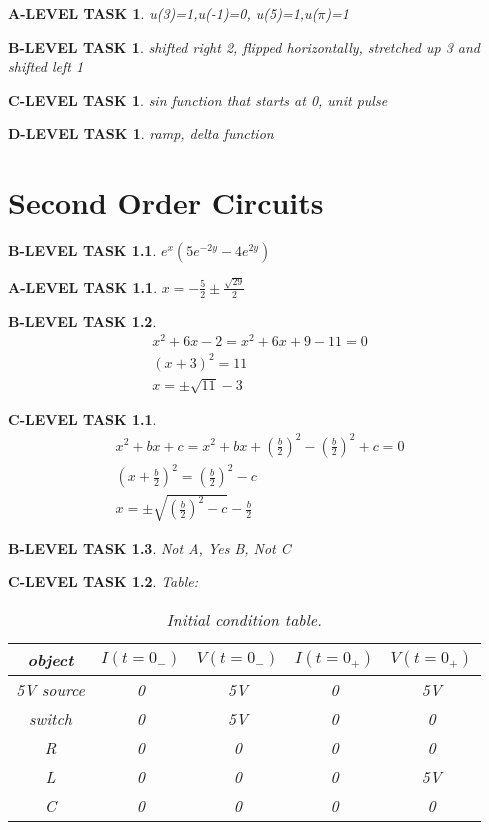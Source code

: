 \documentclass{book}
\numberwithin{equation}{section}
\newtheorem{alevel}{A-LEVEL TASK}
\newtheorem{blevel}{B-LEVEL TASK}
\newtheorem{clevel}{C-LEVEL TASK}
\newtheorem{dlevel}{D-LEVEL TASK}
\theoremstyle{definition}
\begin{document}
\begin{alevel}u(3)=1,u(-1)=0, u(5)=1,u($\pi$)=1\end{alevel}
\begin{blevel}shifted right 2, flipped horizontally, stretched up 3 and shifted left 1\end{blevel}
\begin{clevel}sin function that starts at 0, unit pulse\end{clevel}
\begin{dlevel}ramp, delta function\end{dlevel}

\chapter{Second Order Circuits}
\begin{blevel}$e^{x}(5e^{-2y}-4e^{2y})$\end{blevel}
\begin{alevel}$x=-\frac{5}{2} \pm \frac{\sqrt{29}}{2}$\end{alevel}
\begin{blevel}\begin{align*}
x^2+6x-2 = x^2+6x+9-11=0\\
(x+3)^2=11\\
x=\pm \sqrt{11}-3
\end{align*}
\end{blevel}
\begin{clevel}\begin{align*}
x^2+bx+c = x^2+bx+(\frac{b}{2})^2-(\frac{b}{2})^2+c=0\\
(x+\frac{b}{2})^2=(\frac{b}{2})^2-c\\
x=\pm \sqrt{(\frac{b}{2})^2-c}-\frac{b}{2}
\end{align*}
\end{clevel}
\begin{blevel}Not A, Yes B, Not C\end{blevel}

\begin{clevel} Table:\par
\begin{table}[H]
\begin{center}
\begin{tabular}{|c|c|c|c|c|} \hline
object	&$I(t=0_{-})$	&$V(t=0_{-})$	&$I(t=0_{+})$	&$V(t=0_{+})$ \\ \hline
5V source&0&5V&0&5V \\ \hline
switch&0&5V&0&0 \\ \hline
R&0&0&0&0 \\ \hline
L&0&0&0&5V \\ \hline
C&0&0&0&0 \\ \hline
\end{tabular}
\caption{Initial condition table.}
\label{T:ic}
\end{center}
\end{table}
\end{clevel}
\end{document}
